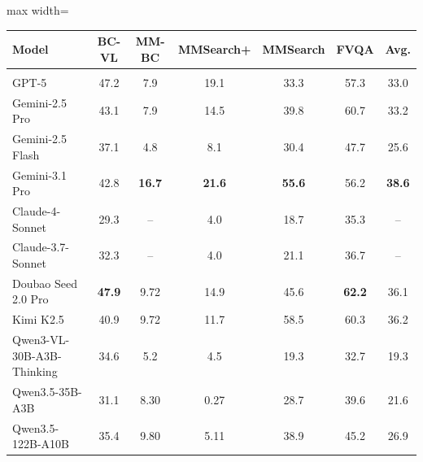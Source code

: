 \begin{table}[t]
\vspace{-15mm}
\centering
\footnotesize
\setlength{\tabcolsep}{5pt}
\renewcommand{\arraystretch}{1.12}
\begin{adjustbox}{max width=\textwidth}
\begin{tabular}{lcccccc}
\toprule[1.2pt]
\rowcolor{tablehead}
\textbf{Model} &
\textbf{BC-VL} &
\textbf{MM-BC} &
\textbf{MMSearch+} &
\textbf{MMSearch} &
\textbf{FVQA} &
\textbf{Avg.} \\
\midrule
\rowcolor{tablesection}
\multicolumn{7}{c}{\textbf{Direct Answer MLLMs}} \\
\midrule
GPT-5 & 47.2 & 7.9 & 19.1 & 33.3 & 57.3 & 33.0 \\
Gemini-2.5 Pro & 43.1 & 7.9 & 14.5 & 39.8 & 60.7 & 33.2 \\
Gemini-2.5 Flash & 37.1 & 4.8 & 8.1 & 30.4 & 47.7 & 25.6 \\
Gemini-3.1 Pro & 42.8 & \textbf{16.7} & \textbf{21.6} & \textbf{55.6} & 56.2 & \textbf{38.6}\\ 
Claude-4-Sonnet & 29.3 & -- & 4.0 & 18.7 & 35.3 & -- \\
Claude-3.7-Sonnet & 32.3 & -- & 4.0 & 21.1 & 36.7 & -- \\
Doubao Seed 2.0 Pro & \textbf{47.9} & 9.72 & 14.9 & 45.6 & \textbf{62.2} & 36.1 \\
Kimi K2.5~\citep{team2026kimi} & 40.9 & 9.72 & 11.7 & 58.5 & 60.3 & 36.2 \\
Qwen3-VL-30B-A3B-Thinking~\citep{bai2025qwen3} & 34.6 & 5.2 & 4.5 & 19.3 & 32.7 & 19.3 \\
Qwen3.5-35B-A3B~\citep{qwen35blog} & 31.1 & 8.30 & 0.27 & 28.7 & 39.6 & 21.6 \\
Qwen3.5-122B-A10B~\citep{qwen35blog} & 35.4 & 9.80 & 5.11 & 38.9 & 45.2 & 26.9 \\


\end{tabular}
\end{adjustbox}
\end{table}

